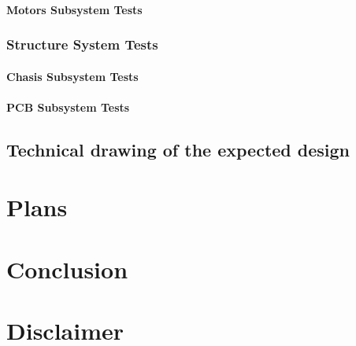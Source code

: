 \documentclass[a4paper,12pt]{article}
\begin{document}
	\paragraph{Motors Subsystem Tests}
	
	
	\subsubsection{Structure System Tests}
	
	\paragraph{Chasis Subsystem Tests}	
		
	\paragraph{PCB Subsystem Tests}
	
	
	\subsection{Technical drawing of the expected design}
	

\section{Plans}


\section{Conclusion}



\section{Disclaimer}
\end{document}
